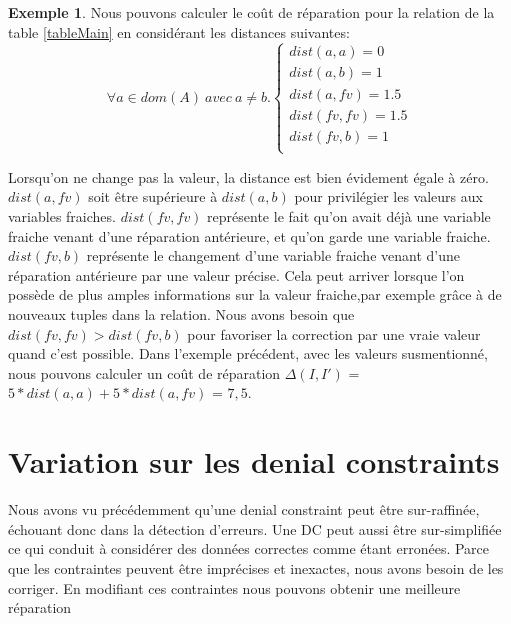 \documentclass[letterpaper, 12pt]{report}
\theoremstyle{definition}
\newtheorem{myexample}{Exemple}
\begin{document}
\begin{myexample}
\label{exampleDist}
Nous pouvons calculer le coût de réparation pour la relation de la table \ref{tableMain} en considérant les distances suivantes:\\

$$
\forall a \in dom(A) \ avec \ a \neq b.
\left\{
	\begin{array}{ll}
	   dist(a,a)=0\\
	   dist(a,b)=1\\
	   dist(a,fv)=1.5\\
	   dist(fv,fv)=1.5\\
	   dist(fv,b)=1\\
	\end{array}
\right.
$$

Lorsqu'on ne change pas la valeur, la distance est bien évidement égale à zéro. $dist(a,fv)$ soit être supérieure à $dist(a,b)$ pour privilégier les valeurs aux variables fraiches. $dist(fv,fv)$ représente le fait qu'on avait déjà une variable fraiche venant d'une réparation antérieure, et qu'on garde une variable fraiche. $dist(fv,b)$ représente le changement d'une variable fraiche venant d'une réparation antérieure par une valeur précise. Cela peut arriver lorsque l'on possède de plus amples informations sur la valeur fraiche,par exemple grâce à de nouveaux tuples dans la relation. Nous avons besoin que $dist(fv,fv) > dist(fv,b)$ pour favoriser la correction par une vraie valeur quand c'est possible. Dans l'exemple précédent, avec les valeurs susmentionné, nous pouvons calculer un coût de réparation $\Delta(I,I')$ =$5*dist(a,a) + 5*dist(a,fv)$ = $7,5$.
\end {myexample}

\section{Variation sur les denial constraints}

Nous avons vu précédemment qu'une denial constraint peut être sur-raffinée, échouant donc dans la détection d'erreurs. Une DC peut aussi être sur-simplifiée ce qui conduit à considérer des données correctes comme étant erronées. Parce que les contraintes peuvent être imprécises et inexactes, nous avons besoin de les corriger. En modifiant ces contraintes nous pouvons obtenir une meilleure réparation\\
\end{document}
